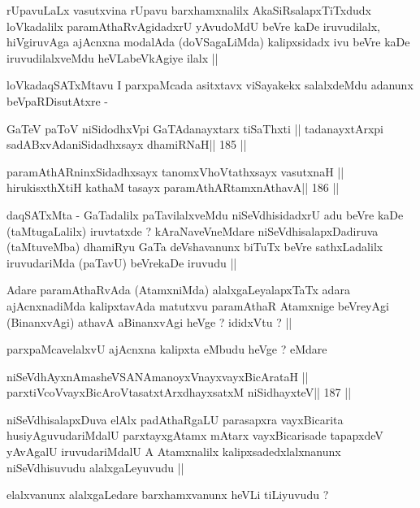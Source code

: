 \begin{artha}
rUpavuLaLx vasutxvina rUpavu barxhamxnalilx AkaSiRsalapxTiTxdudx
loVkadalilx paramAthaRvAgidadxrU yAvudoMdU beVre kaDe iruvudilalx,
hiVgiruvAga ajAcnxna modalAda (doVSagaLiMda) kalipxsidadx ivu beVre
kaDe iruvudilalxveMdu heVLabeVkAgiye ilalx ||
\end{artha}

\begin{artha}
loVkadaqSATxMtavu I parxpaMcada asitxtavx viSayakekx salalxdeMdu
adanunx beVpaRDisutAtxre -
\end{artha}

\begin{shl}
GaTeV paToV niSidodhxV\s pi GaTAdanayxtarx tiSaThxti ||
tadanayxtArxpi sadABxvAdaniSidadhxsayx dhamiRNaH\hfill || 185 ||
\end{shl}

\begin{shl}
paramAthARninxSidadhxsayx tanomxVhoVtathxsayx vasutxnaH ||
hirukisxthXtiH kathaM tasayx paramAthARtamxnA\s thavA\hfill || 186 ||
\end{shl}

\begin{artha}
daqSATxMta - GaTadalilx paTavilalxveMdu niSeVdhisidadxrU adu beVre
kaDe (taMtugaLalilx) iruvtatxde ?  kAraNaveVneMdare
niSeVdhisalapxDadiruva (taMtuveMba) dhamiRyu GaTa deVshavanunx biTuTx
beVre sathxLadalilx iruvudariMda (paTavU) beVrekaDe iruvudu ||
\end{artha}

\begin{artha}
Adare paramAthaRvAda (AtamxniMda) alalxgaLeyalapxTaTx adara
ajAcnxnadiMda kalipxtavAda matutxvu paramAthaR Atamxnige beVreyAgi
(BinanxvAgi) athavA aBinanxvAgi heVge ? ididxVtu ? ||

parxpaMcavelalxvU ajAcnxna kalipxta eMbudu heVge ? eMdare
\end{artha}

\begin{shl}
niSeVdhAyxnAmasheVSANAmanoyxVnayxvayxBicArataH ||
parxtiVcoV\s vayxBicAroV\s tasatxtArxdhayxsatxM niSidhayxteV\hfill || 187 ||
\end{shl}

\begin{artha}
niSeVdhisalapxDuva elAlx padAthaRgaLU parasapxra vayxBicarita
husiyAguvudariMdalU parxtayxgAtamx mAtarx vayxBicarisade tapapxdeV
yAvAgalU iruvudariMdalU A Atamxnalilx kalipxsadedxlalxnanunx
niSeVdhisuvudu alalxgaLeyuvudu ||

elalxvanunx alalxgaLedare barxhamxvanunx heVLi tiLiyuvudu ?
\end{artha}

